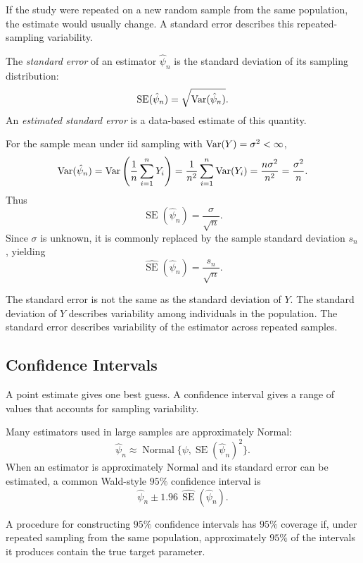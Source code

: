 If the study were repeated on a new random sample from the same population, the estimate would usually change. A standard error describes this repeated-sampling variability.

\begin{definition}
The \emph{standard error} of an estimator $\hat\psi_n$ is the standard deviation of its sampling distribution:
\[
\operatorname{SE}(\hat\psi_n)=\sqrt{\operatorname{Var}(\hat\psi_n)}.
\]
An \emph{estimated standard error} is a data-based estimate of this quantity.
\end{definition}

For the sample mean under iid sampling with $\operatorname{Var}(Y)=\sigma^2<\infty$,
\[
\operatorname{Var}(\hat\psi_n)
=\operatorname{Var}\left(\frac{1}{n}\sum_{i=1}^n Y_i\right)
=\frac{1}{n^2}\sum_{i=1}^n \operatorname{Var}(Y_i)
=\frac{n\sigma^2}{n^2}
=\frac{\sigma^2}{n}.
\]
Thus
\[
\operatorname{SE}(\hat\psi_n)=\frac{\sigma}{\sqrt n}.
\]
Since $\sigma$ is unknown, it is commonly replaced by the sample standard deviation $s_n$, yielding
\[
\widehat{\operatorname{SE}}(\hat\psi_n)=\frac{s_n}{\sqrt n}.
\]

The standard error is not the same as the standard deviation of $Y$. The standard deviation of $Y$ describes variability among individuals in the population. The standard error describes variability of the estimator across repeated samples.

\subsection{Confidence Intervals}

A point estimate gives one best guess. A confidence interval gives a range of values that accounts for sampling variability.

Many estimators used in large samples are approximately Normal:
\[
\hat\psi_n \approx \operatorname{Normal}\{\psi,\operatorname{SE}(\hat\psi_n)^2\}.
\]
When an estimator is approximately Normal and its standard error can be estimated, a common Wald-style $95\%$ confidence interval is
\[
\hat\psi_n \pm 1.96\,\widehat{\operatorname{SE}}(\hat\psi_n).
\]

\begin{definition}
A procedure for constructing $95\%$ confidence intervals has $95\%$ coverage if, under repeated sampling from the same population, approximately $95\%$ of the intervals it produces contain the true target parameter.
\end{definition}

